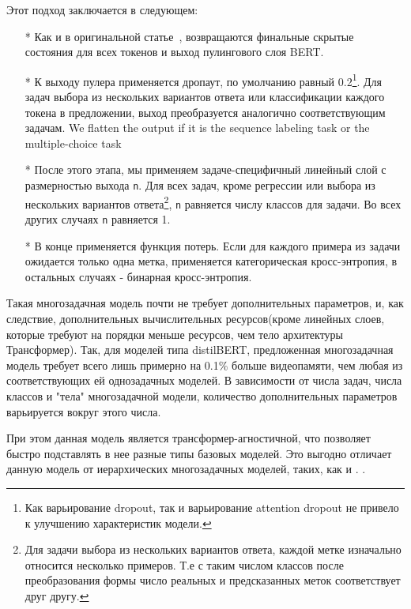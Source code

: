 Этот подход заключается в следующем:
\begin{itemize}

    \item[*] Как и в оригинальной статье~\cite{bert}, возвращаются финальные скрытые состояния для всех токенов и выход пулингового слоя BERT. 

    \item[*] К выходу пулера применяется дропаут, по умолчанию равный 0.2\footnote{Как варьирование dropout, так и варьирование attention dropout не привело к улучшению характеристик модели.}. Для задач выбора из нескольких вариантов ответа или классификации каждого токена в предложении, выход преобразуется аналогично соответствующим задачам. We flatten the output if it is the sequence labeling task or the multiple-choice task

    \item[*]После этого этапа, мы применяем задаче-специфичный линейный слой с размерностью выхода \texttt{n}. Для всех задач, кроме регрессии или выбора из нескольких вариантов ответа\footnote{Для задачи выбора из нескольких вариантов ответа, каждой метке изначально относится несколько примеров. Т.е с таким числом классов после преобразования формы число реальных и предсказанных меток соответствует друг другу.}, \texttt{n} равняется числу классов для задачи. Во всех других случаях \texttt{n} равняется 1.
 
    \item[*]В конце применяется функция потерь. Если для каждого примера из задачи ожидается только одна метка, применяется категорическая кросс-энтропия, в остальных случаях - бинарная кросс-энтропия. 

\end{itemize}

Такая многозадачная модель почти не требует дополнительных параметров, и, как следствие, дополнительных вычислительных ресурсов(кроме линейных слоев, которые требуют на порядки меньше ресурсов, чем тело архитектуры Трансформер). Так, для моделей типа distilBERT, предложенная многозадачная модель требует всего лишь примерно на  0.1\% больше видеопамяти, чем любая из соответствующих ей однозадачных моделей. В зависимости от числа задач, числа классов и "тела" многозадачной модели, количество дополнительных параметров варьируется вокруг этого числа. 

При этом данная модель является трансформер-агностичной, что позволяет быстро подставлять в нее разные типы базовых моделей. Это выгодно отличает данную модель от иерархических многозадачных моделей, таких, как \cite{PAL:19} и \cite{TaskEmbedded2021}. 
. 

